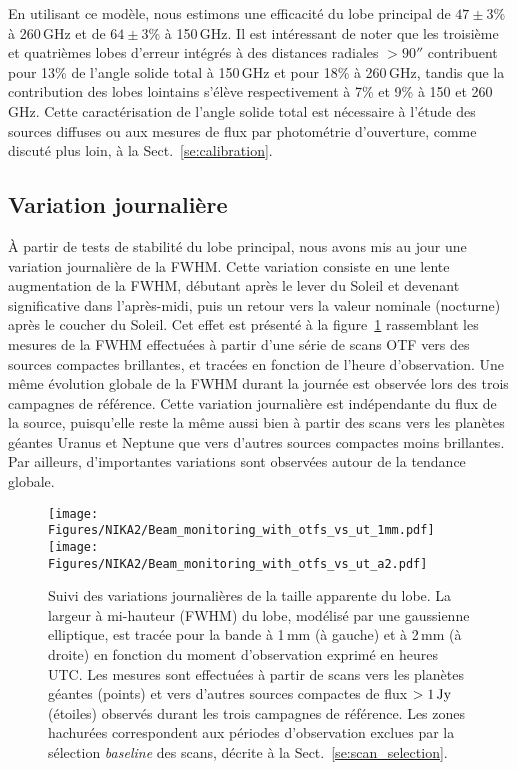 En utilisant ce modèle, nous estimons une efficacité du lobe principal de
$47 \pm 3\%$ à 260\,GHz et de $64 \pm 3\%$ à 150\,GHz. Il est
intéressant de noter que les troisième et quatrièmes lobes d'erreur
intégrés à des distances radiales $>90''$ contribuent pour 13\% de
l'angle solide total à 150\,GHz et pour 18\% à 260\,GHz, tandis que la
contribution des lobes lointains s'élève respectivement à 7\% et 9\% à 150 et
260\,GHz. Cette caractérisation de l'angle solide total est nécessaire
à l'étude des sources diffuses ou aux mesures de flux par photométrie
d'ouverture, comme discuté plus loin, à la Sect.~\ref{se:calibration}.


\subsection{Variation journalière}
\label{se:fwhm_variations}

\`A partir de tests de stabilité du lobe principal, nous
avons mis au jour une variation journalière de la FWHM. Cette
variation consiste en une lente augmentation de la FWHM, débutant
après le lever du Soleil et devenant significative dans l'après-midi,
puis un retour vers la valeur nominale (nocturne) après le coucher du
Soleil. Cet effet est présenté à la
figure~\ref{fig:beam_monitoring_otf} rassemblant les mesures de la
FWHM effectuées à partir d'une série de scans OTF vers des sources
compactes brillantes, et tracées en fonction de l'heure
d'observation. Une même évolution globale de la FWHM durant la journée
est observée lors des trois campagnes de référence. Cette variation
journalière est indépendante du flux de la source, puisqu'elle reste
la même aussi bien à partir des scans vers les planètes géantes Uranus
et Neptune que vers d'autres sources compactes moins brillantes. Par
ailleurs, d'importantes variations sont observées autour de la
tendance globale.
%
\begin{figure}[ht!]
  \begin{center}
    \texttt{[image: Figures/NIKA2/Beam\_monitoring\_with\_otfs\_vs\_ut\_1mm.pdf]}
    \texttt{[image: Figures/NIKA2/Beam\_monitoring\_with\_otfs\_vs\_ut\_a2.pdf]}
    \caption[Beam size monitoring using OTF scans]{Suivi des
      variations journalières de la taille apparente du lobe. La
      largeur à mi-hauteur (FWHM) du lobe, modélisé par une gaussienne
      elliptique, est tracée pour la bande à 1\,mm (à gauche) et à
      2\,mm (à droite) en fonction du moment d'observation exprimé en
      heures UTC. Les mesures sont effectuées à partir de scans vers
      les planètes géantes (points) et vers d'autres sources
      compactes de flux $>1\,\rm{Jy}$ (étoiles) observés durant les
      trois campagnes de référence. Les zones hachurées correspondent
      aux périodes d'observation exclues par la sélection
      \emph{baseline} des scans, décrite à la Sect.~\ref{se:scan_selection}.} 
\label{fig:beam_monitoring_otf}
  \end{center}
\end{figure}

